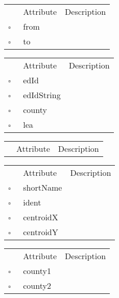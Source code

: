 \begin{table}
\caption{DistanceError  }

\begin{longtable}{llp{8cm}}
& Attribute & Description \\
$\square$\ & from &  \\
$\square$\ & to &  \\
\end{longtable}
\label{attr:DistanceError}
\end{table}

\begin{table}
\caption{ElectoralDivision  }

\begin{longtable}{llp{8cm}}
& Attribute & Description \\
$\square$\ & edId &  \\
$\square$\ & edIdString &  \\
$\square$\ & county &  \\
$\square$\ & lea &  \\
\end{longtable}
\label{attr:ElectoralDivision}
\end{table}

\clearpage
\begin{table}
\caption{Lea  }

\begin{longtable}{llp{8cm}}
& Attribute & Description \\
\end{longtable}
\label{attr:Lea}
\end{table}

\begin{table}
\caption{MapLocation  }

\begin{longtable}{llp{8cm}}
& Attribute & Description \\
$\square$\ & shortName &  \\
$\square$\ & ident &  \\
$\square$\ & centroidX &  \\
$\square$\ & centroidY &  \\
\end{longtable}
\label{attr:MapLocation}
\end{table}

\begin{table}
\caption{NeighborCounty  }

\begin{longtable}{llp{8cm}}
& Attribute & Description \\
$\square$\ & county1 &  \\
$\square$\ & county2 &  \\
\end{longtable}
\label{attr:NeighborCounty}
\end{table}

